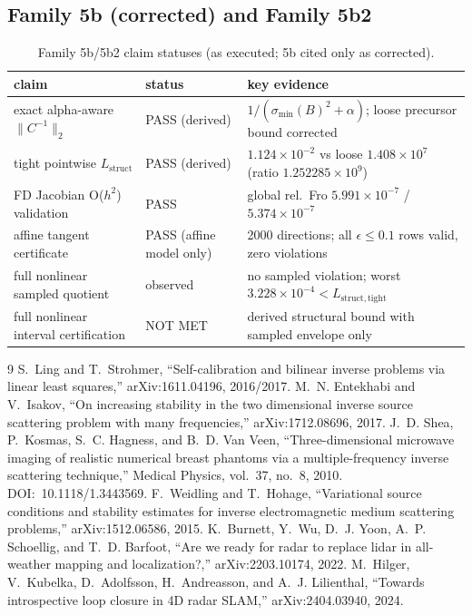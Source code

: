 \documentclass[12pt]{article}
\begin{document}
\subsection{Family 5b (corrected) and Family 5b2}
\begin{table}[ht]
\centering
\small
\caption{Family 5b/5b2 claim statuses (as executed; 5b cited only as
corrected).}
\label{app:tab:f5b2}
\begin{tabular}{p{} p{} p{}}
\toprule
claim & status & key evidence \\
\midrule
exact alpha-aware $\|C^{-1}\|_2$ & PASS (derived) &
$1/(\sigma_{\min}(B)^2+\alpha)$; loose precursor bound corrected \\
tight pointwise $L_{\mathrm{struct}}$ & PASS (derived) &
$1.124\times10^{-2}$ vs loose $1.408\times10^7$
(ratio $1.252285\times10^9$) \\
FD Jacobian O($h^2$) validation & PASS &
global rel.\ Fro $5.991\times10^{-7}$ / $5.374\times10^{-7}$ \\
affine tangent certificate & PASS (affine model only) &
2000 directions; all $\epsilon\le0.1$ rows valid, zero violations \\
full nonlinear sampled quotient & observed &
no sampled violation; worst $3.228\times10^{-4}<L_{\mathrm{struct,tight}}$ \\
full nonlinear interval certification & NOT MET &
derived structural bound with sampled envelope only \\
\bottomrule
\end{tabular}
\end{table}

\begin{thebibliography}{9}
 S.~Ling and T.~Strohmer, ``Self-calibration and bilinear
inverse problems via linear least squares,'' arXiv:1611.04196, 2016/2017.
 M.~N. Entekhabi and V.~Isakov, ``On increasing stability
in the two dimensional inverse source scattering problem with many
frequencies,'' arXiv:1712.08696, 2017.
 J.~D. Shea, P.~Kosmas, S.~C. Hagness, and B.~D. Van Veen,
``Three-dimensional microwave imaging of realistic numerical breast phantoms
via a multiple-frequency inverse scattering technique,'' Medical Physics,
vol.~37, no.~8, 2010. DOI:~10.1118/1.3443569.
 F.~Weidling and T.~Hohage, ``Variational source conditions
and stability estimates for inverse electromagnetic medium scattering
problems,'' arXiv:1512.06586, 2015.
 K.~Burnett, Y.~Wu, D.~J. Yoon, A.~P. Schoellig, and
T.~D. Barfoot, ``Are we ready for radar to replace lidar in all-weather
mapping and localization?,'' arXiv:2203.10174, 2022.
 M.~Hilger, V.~Kubelka, D.~Adolfsson, H.~Andreasson, and
A.~J. Lilienthal, ``Towards introspective loop closure in 4D radar SLAM,''
arXiv:2404.03940, 2024.
\end{thebibliography}
\end{document}

